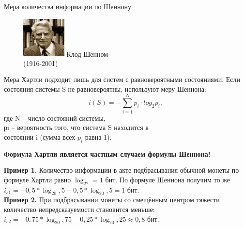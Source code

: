 \documentclass[9pt,aspectratio=169]{beamer}
\begin{document}
	\begin{frame}{Мера количества информации по Шеннону}
	    \begin{figure}
	        \begin{center}
	            \vskip -1cm
   				 \includegraphics[width=0.20\textwidth]{17}
  			Клод Шенном\\ (1916-2001)
  			\end{center}
    	\end{figure}
		\noindent Мера Хартли подходит лишь для систем с равновероятными состояниями. 
		\noindent Если состояния системы S не равновероятны, используют меру Шеннона:
		$$i(S)=-\sum_{i=1}^Np_i\cdot log_2p_i,$$
		где N – число состояний системы,\\
		\noindent рi – вероятность того, что система S находится в\\
		\noindent состоянии i (сумма всех $p_i$ равна 1).
		\vspace{0.2cm}
		\begin{center}
			\color[rgb]{0.2,0.7,0.4}
			\textbf{Формула Хартли является частным случаем формулы Шеннона!}
			\color{black}
		\end{center}
		\noindent\textbf{Пример 1.} Количество информации в акте подбрасывания обычной монеты по формуле Хартли равно $\log_22=1$ бит. По 				формуле Шеннона получим то же $i_{s1}=-0,5*\log_20,5-0,5*\log_20,5=1$ бит.\\
		\noindent\textbf{Пример 2.} При подбрасывании монеты со смещённым центром тяжести количество непредсказуемости становится меньше: 				$i_{s2}=-0,75*\log_20,75-0,25*\log_20,25\approx0,8$ бит.
	\end{frame}
\end{document}
